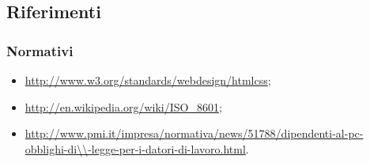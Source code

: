 \subsection{Riferimenti}

\subsubsection{Normativi}

\begin{itemize}
	\item \url{http://www.w3.org/standards/webdesign/htmlcss};
	\item \url{http://en.wikipedia.org/wiki/ISO_8601}; 	
	\item \url{http://www.pmi.it/impresa/normativa/news/51788/dipendenti-al-pc-obblighi-di\\-legge-per-i-datori-di-lavoro.html}.
\end{itemize}


